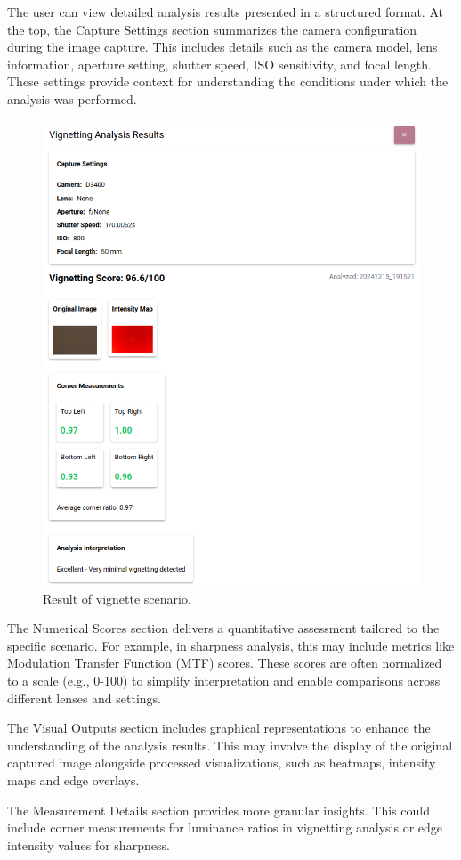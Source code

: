 The user can view detailed analysis results presented in a structured format. At the top, the Capture Settings section summarizes the camera configuration during the image capture. This includes details such as the camera model, lens information, aperture setting, shutter speed, ISO sensitivity, and focal length. These settings provide context for understanding the conditions under which the analysis was performed.

\begin{figure}[hbt]
\centering
\includegraphics[height=0.8\textwidth]{Images/scenario_result.png}
\caption{Result of vignette scenario.}
\label{fig:ui_scenario_result}
\end{figure}

The Numerical Scores section delivers a quantitative assessment tailored to the specific scenario. For example, in sharpness analysis, this may include metrics like Modulation Transfer Function (MTF) scores. These scores are often normalized to a scale (e.g., 0-100) to simplify interpretation and enable comparisons across different lenses and settings.

The Visual Outputs section includes graphical representations to enhance the understanding of the analysis results. This may involve the display of the original captured image alongside processed visualizations, such as heatmaps, intensity maps and edge overlays.

The Measurement Details section provides more granular insights. This could include corner measurements for luminance ratios in vignetting analysis or edge intensity values for sharpness.

